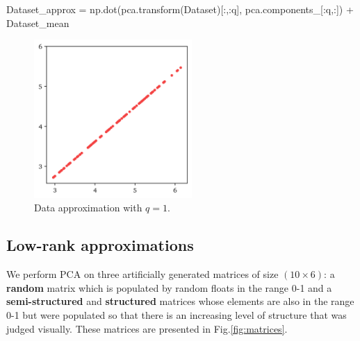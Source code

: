 \documentclass[10pt,twocolumn]{article}
\begin{document}
\begin{python}
Dataset_approx = 
np.dot(pca.transform(Dataset)[:,:q], 
pca.components_[:q,:]) + Dataset_mean
\end{python}

\begin{figure}[H]
\centering\includegraphics[width=6cm]{python-data-approximation.png}
\caption{Data approximation with $q = 1$.}
\label{fig:python-data-approximation}
\end{figure}

\subsection{Low-rank approximations}

We perform PCA on three artificially generated matrices of size $(10 \times 6)$: a \textbf{random} matrix which is populated by random floats in the range 0-1 and a \textbf{semi-structured} and \textbf{structured} matrices whose elements are also in the range 0-1 but were populated so that there is an increasing level of structure that was judged visually. These matrices are presented in Fig.\ref{fig:matrices}.
\end{document}
